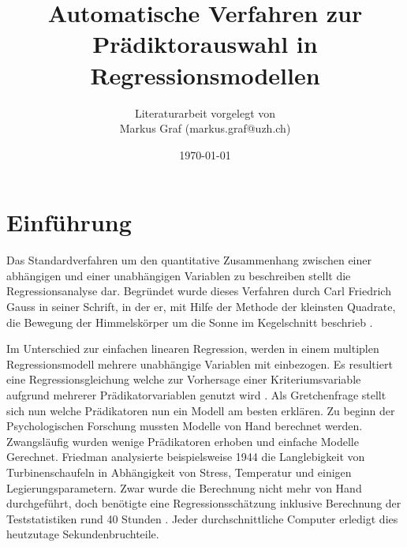 \documentclass[english,12pt,doc]{apa}
\begin{document}
\title{Automatische Verfahren zur Prädiktorauswahl in Regressionsmodellen}
\author{Literaturarbeit vorgelegt von \\ Markus Graf (markus.graf@uzh.ch)}
\date{\today}
\maketitle
\setlength{\parindent}{0pt}
\newpage
\tableofcontents
\newpage
\section{Einführung}
Das Standardverfahren um den quantitative Zusammenhang zwischen einer abhängigen und einer unabhängigen Variablen zu beschreiben stellt die Regressionsanalyse dar. 
Begründet wurde dieses Verfahren durch Carl Friedrich Gauss in seiner Schrift, in der er, mit Hilfe der Methode der kleinsten Quadrate, die Bewegung der Himmelskörper um die Sonne im Kegelschnitt beschrieb \cite{gauss1809theoria}. 

Im Unterschied zur einfachen linearen Regression, werden in einem multiplen Regressionsmodell mehrere unabhängige Variablen mit einbezogen. 
Es resultiert eine Regressionsgleichung welche zur Vorhersage einer Kriteriumsvariable aufgrund mehrerer Prädikatorvariablen genutzt wird  \cite[S. 448]{bortz2011}. 
Als Gretchenfrage stellt sich nun welche Prädikatoren nun ein Modell am besten erklären. 
Zu beginn der Psychologischen Forschung mussten Modelle von Hand berechnet werden. Zwangsläufig wurden wenige Prädikatoren erhoben und einfache Modelle Gerechnet. 
Friedman analysierte beispielsweise 1944 die Langlebigkeit von Turbinenschaufeln in Abhängigkeit von Stress, Temperatur und einigen Legierungsparametern. 
Zwar wurde die Berechnung nicht mehr von Hand durchgeführt, doch benötigte eine Regressionsschätzung inklusive Berechnung der Teststatistiken rund 40 Stunden \cite[p.2]{armstrong2011illusions}. Jeder durchschnittliche Computer erledigt dies heutzutage Sekundenbruchteile. 
\end{document}
